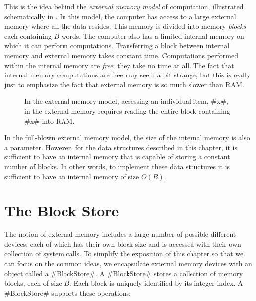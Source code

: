 
This is the idea behind the \emph{external memory model} of computation,
illustrated schematically in .  In this model, the computer
has access to a large external memory where all the data resides.
This memory is divided into memory \emph{blocks} each containing $B$
words.  The computer also has a limited internal memory on which it can
perform computations.  Transferring a block between internal memory and
external memory takes constant time.  Computations performed within the
internal memory are \emph{free}; they take no time at all.  The fact
that internal memory computations are free may seem a bit strange,
but this is really just to emphasize the fact that external memory is
so much slower than RAM.

\begin{figure}
  \caption[The external memory model]{In the external memory model,
  accessing an individual item, #x#, in the external memory requires
  reading the entire block containing #x# into RAM.}
\end{figure}

In the full-blown external memory model, the size of the internal memory
is also a parameter.  However, for the data structures described in this
chapter, it is sufficient to have an internal memory that is capable
of storing a constant number of blocks.  In other words, to implement
these data structures it is sufficient to have an internal memory of
size $O(B)$.

\section{The Block Store}

The notion of external memory includes a large number of possible
different devices, each of which has their own block size and is
accessed with their own collection of system calls.  To simplify the
exposition of this chapter so that we can focus on the common ideas, we
encapsulate external memory devices with an object called a #BlockStore#.
A #BlockStore# stores a collection of memory blocks, each of size $B$.
Each block is uniquely identified by its integer index.  A #BlockStore#
supports these operations:

